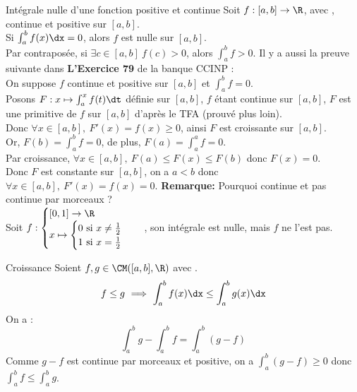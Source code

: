 \documentclass[11pt]{article}
\begin{document}
\begin{prop}{Intégrale nulle d'une fonction positive et continue}{}
    Soit $f:[a,b]\to\R$, avec , continue et positive sur $[a,b]$.\\
    Si $\int_a^bf(x)\dx=0$, alors $f$ est nulle sur $[a,b]$.\\
    Par contraposée, si $\exists c \in [a,b] ~ f(c)>0$, alors $\int_a^bf>0$.
    \tcblower
    Il y a aussi la preuve suivante dans \textbf{L'Exercice 79} de la banque CCINP :\\
    On suppose $f$ continue et positive sur $[a,b]$ et $\int_a^bf=0$.\\
    Posons $F:x\mapsto\int_a^xf(t)\dt$ définie sur $[a,b]$, $f$ étant continue sur $[a,b]$, $F$ est une primitive de $f$ sur $[a,b]$ d'après le TFA (prouvé plus loin).\\
    Donc $\forall x \in [a,b], ~ F'(x)=f(x)\geq0$, ainsi $F$ est croissante sur $[a,b]$.\\
    Or, $F(b)=\int_a^bf=0$, de plus, $F(a)=\int_a^af=0$.\\
    Par croissance, $\forall x \in [a,b], ~ F(a) \leq F(x)\leq F(b)$ donc $F(x)=0$.\\
    Donc $F$ est constante sur $[a,b]$, on a $a<b$ donc $\forall x\in[a,b], ~ F'(x)=f(x)=0$.
    \n\textbf{Remarque:} Pourquoi continue et pas continue par morceaux ?\\
    Soit $f:\begin{cases}[0,1]\to\R\\x\mapsto\begin{cases}0 \text{ si } x\neq\frac{1}{2}\\1 \text{ si } x=\frac{1}{2}\end{cases}\end{cases}$, son intégrale est nulle, mais $f$ ne l'est pas.
\end{prop}

\begin{prop}{Croissance}{}
    Soient $f,g\in\CM([a,b],\R)$ avec .
    \begin{equation*}
        f \leq g ~ \Longrightarrow ~ \int_a^bf(x)\dx \leq \int_a^b g(x)\dx
    \end{equation*}
    \tcblower
    On a :
    \begin{equation*}
        \int_a^b g - \int_a^b f = \int_a^b(g-f)
    \end{equation*}
    Comme $g-f$ est continue par morceaux et positive, on a $\int_a^b(g-f)\geq0$ donc $\int_a^bf\leq\int_a^bg$.
\end{prop}
\end{document}
